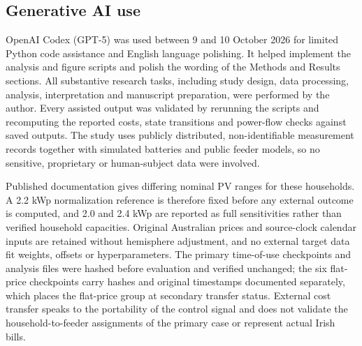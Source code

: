 \documentclass[pdflatex,Numbered,sn-basic]{sn-jnl}
\begin{document}
\subsection{Generative AI use}

OpenAI Codex (GPT-5) was used between 9 and 10 October 2026 for limited Python code assistance and English language polishing. It helped implement the analysis and figure scripts and polish the wording of the Methods and Results sections. All substantive research tasks, including study design, data processing, analysis, interpretation and manuscript preparation, were performed by the author. Every assisted output was validated by rerunning the scripts and recomputing the reported costs, state transitions and power-flow checks against saved outputs. The study uses publicly distributed, non-identifiable measurement records together with simulated batteries and public feeder models, so no sensitive, proprietary or human-subject data were involved.

Published documentation gives differing nominal PV ranges for these households. A 2.2 kWp normalization reference is therefore fixed before any external outcome is computed, and 2.0 and 2.4 kWp are reported as full sensitivities rather than verified household capacities. Original Australian prices and source-clock calendar inputs are retained without hemisphere adjustment, and no external target data fit weights, offsets or hyperparameters. The primary time-of-use checkpoints and analysis files were hashed before evaluation and verified unchanged; the six flat-price checkpoints carry hashes and original timestamps documented separately, which places the flat-price group at secondary transfer status. External cost transfer speaks to the portability of the control signal and does not validate the household-to-feeder assignments of the primary case or represent actual Irish bills.
\end{document}
